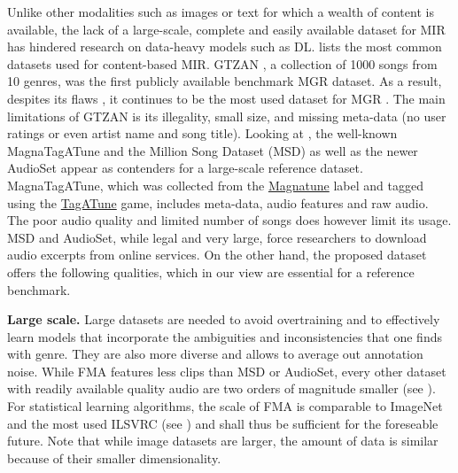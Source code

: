 \documentclass{article}
\begin{document}
Unlike other modalities such as images or text for which a wealth of content is available, the lack of a large-scale, complete and easily available dataset for MIR has hindered research on data-heavy models such as DL.
 lists the most common datasets used for content-based MIR.
GTZAN \cite{gtzan}, a collection of 1000 songs from 10 genres, was the first publicly available benchmark MGR dataset. As a result, despites its flaws \cite{gtzan_critic_1}, it continues to be the most used dataset for MGR \cite{mgr_eval}. The main limitations of GTZAN is its illegality, small size, and missing meta-data (no user ratings or even artist name and song title). %
Looking at , the well-known MagnaTagATune and the Million Song Dataset (MSD) as well as the newer AudioSet appear as contenders for a large-scale reference dataset. %
MagnaTagATune, which was collected from the \href{https://magnatune.com/}{Magnatune} label and tagged using the \href{http://tagatune.org/}{TagATune} game, includes meta-data, audio features and raw audio. The poor audio quality and limited number of songs does however limit its usage.
MSD and AudioSet, while legal and very large, force researchers to download audio excerpts from online services.
On the other hand, the proposed dataset offers the following qualities, which in our view are essential for a reference benchmark.

\textbf{Large scale.} Large datasets are needed to avoid overtraining and to effectively learn models that incorporate the ambiguities and inconsistencies that one finds with genre. They are also more diverse and allows to average out annotation noise.
While FMA features less clips than MSD or AudioSet, every other dataset with readily available quality audio are two orders of magnitude smaller (see ).
For statistical learning algorithms, the scale of FMA is comparable to ImageNet and the most used ILSVRC (see ) and shall thus be sufficient for the foreseable future.
Note that while image datasets are larger, the amount of data is similar because of their smaller dimensionality.
\end{document}

